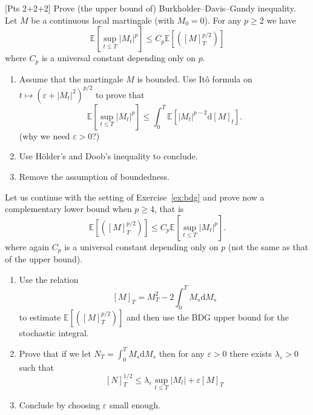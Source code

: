 \documentclass{article}
\newcommand{\mathd}{\mathrm{d}}
\newenvironment{enumeratealpha}{\begin{enumerate}[a{\textup{)}}] }{\end{enumerate}}
{\theorembodyfont{\rmfamily\small}\newtheorem{exercise}{Exercise}}
\begin{document}
\begin{exercise}
  \label{ex:bdg}[Pts 2+2+2] Prove (the upper bound of)
  Burkholder--Davis--Gundy inequality. Let $M$ be a continuous local
  martingale (with $M_0 = 0$). For any $p \geqslant 2$ we have
  \[ \mathbb{E} [\sup_{t \leqslant T} | M_t |^p] \leqslant C_p \mathbb{E}
     [([M]_T^{p / 2})] \]
  where $C_p$ is a universal constant depending only on $p$.
  \begin{enumeratealpha}
    \item Assume that the martingale $M$ is bounded. Use It{\^o} formula on $t
    \mapsto (\varepsilon + | M_t |^2)^{p / 2}$ to prove that
    \[ \mathbb{E} [\sup_{t \leqslant T} | M_t |^p] \leqslant \int_0^T
       \mathbb{E} [| M_t |^{p - 2} \mathd [M]_t] . \]
    (why we need $\varepsilon > 0$?)
    
    \item Use H{\"o}lder's and Doob's inequality to conclude.
    
    \item Remove the assumption of boundedness.
  \end{enumeratealpha}
\end{exercise}

\hrulefill

\begin{exercise}
  [Pts 2+2+2] Let us continue with the setting of Exercise~\ref{ex:bdg} and
  prove now a complementary lower bound when $p \geqslant 4$, that is
  \[ \mathbb{E} [([M]_T^{p / 2})] \leqslant C_p \mathbb{E} [\sup_{t \leqslant
     T} | M_t |^p] . \]
  where again $C_p$ is a universal constant depending only on $p$ (not the
  same as that of the upper bound).
  \begin{enumeratealpha}
    \item Use the relation
    \[ [M]_T = M^2_T - 2 \int_0^T M_s \mathd M_s \]
    to estimate $\mathbb{E} [([M]_T^{p / 2})]$ and then use the BDG upper
    bound for the stochastic integral.
    
    \item Prove that if we let $N_T = \int_0^T M_s \mathd M_s$ then for any
    $\varepsilon > 0$ there exists $\lambda_{\varepsilon} > 0$ such that
    \[ [N]_T^{1 / 2} \leqslant \lambda_{\varepsilon} \sup_{t \leqslant T} |
       M_t | + \varepsilon [M]_T \]
    \item Conclude by choosing $\varepsilon$ small enough.
  \end{enumeratealpha}
\end{exercise}

\hrulefill

\
\end{document}
